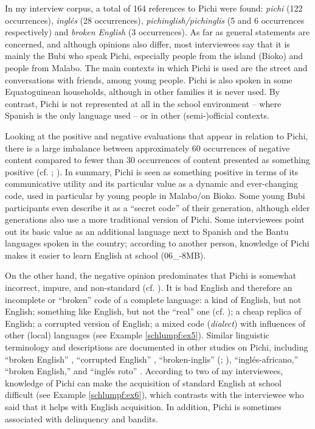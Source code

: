 \documentclass[output=paper]{langscibook}
\begin{document}
In my interview corpus, a total of 164 references to Pichi were found: \textit{pichi} (122 occurrences), \textit{inglés} (28 occurrences), \textit{pichinglish/pichinglis} (5 and 6 occurrences respectively) and \textit{broken English} (3 occurrences). As far as general statements are concerned, and although opinions also differ, most interviewees say that it is mainly the Bubi who speak Pichi, especially people from the island (Bioko) and people from Malabo. The main contexts in which Pichi is used are the street and conversations with friends, among young people. Pichi is also spoken in some Equatoguinean households, although in other families it is never used. By contrast, Pichi is not represented at all in the school environment – where Spanish is the only language used – or in other (semi-)official contexts.

Looking at the positive and negative evaluations that appear in relation to Pichi, there is a large imbalance between approximately 60 occurrences of negative content compared to fewer than 30 occurrences of content presented as something positive (cf. \citealt[218ff]{yakpo_only_2016};  \citeyear{yakpo_o_2016}). In summary, Pichi is seen as something positive in terms of its communicative utility and its particular value as a dynamic and ever-changing code, used in particular by young people in Malabo/on Bioko. Some young Bubi participants even describe it as a ``secret code'' of their generation, although elder generations also use a more traditional version of Pichi. Some interviewees point out its basic value as an additional language next to Spanish and the Bantu languages spoken in the country; according to another person, knowledge of Pichi makes it easier to learn English at school (06\_-8MB).

On the other hand, the negative opinion predominates that Pichi is somewhat incorrect, impure, and non-standard (cf. \citealt[35–36]{yakpo_o_2016}). It is bad English and therefore an incomplete or ``broken''
code of a complete language: a kind of English, but not English; something like English, but not the ``real'' one (cf. \citealt[63]{woolard_language_1994}); a cheap replica of English; a corrupted version of English; a mixed code (\textit{dialect}) with influences of other (local) languages (see Example \ref{schlumpf:ex5}). Similar linguistic terminology and descriptions are documented in other studies on Pichi, including “broken English” \citep[36]{bolekia_boleka_lenguas_2001}, “corrupted English” \citep[356]{castillo_rodriguez_language_2013}, “broken-inglis” (\citealt{lipski_pidgin_1992}; \citeyear[117]{lipski_spanish_2004}), “inglés-africano,” “broken English,” and “inglés roto” \citep[5]{de_zarco_dialecto_1937}. According to two of my interviewees, knowledge of Pichi can make the acquisition of standard English at school difficult (see Example \ref{schlumpf:ex6}), which contrasts with the interviewee who said that it helps with English acquisition. In addition, Pichi is sometimes associated with delinquency and bandits.
\end{document}
